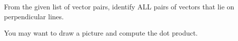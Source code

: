 \documentclass{ximera}
\begin{document}
  \begin{problem}\label{prob:perpvectors1}
  From the given list of vector pairs, identify ALL pairs of vectors that lie on perpendicular lines.
  \begin{hint}
  You may want to draw a picture and compute the dot product.
  \end{hint}
  \begin{selectAll}
  \end{selectAll}
  \end{problem}
   
\end{document}
